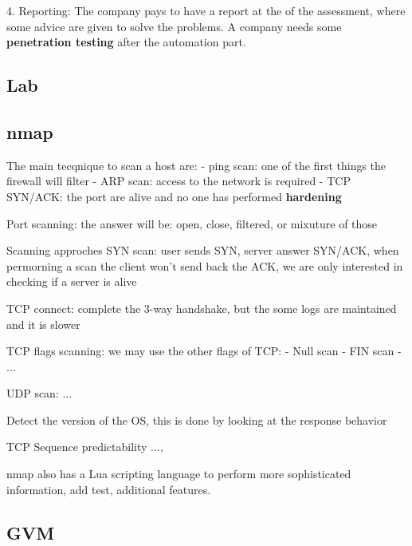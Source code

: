 \documentclass[12pt]{article}
\begin{document}
4. 
Reporting:
The company pays to have a report at the of the assessment, where some advice are given to solve the problems. A company needs some \textbf{penetration testing} after the automation part.


\subsection{Lab}
\subsection{nmap}
The main tecqnique to scan a host are:
- ping scan: one of the first things the firewall will filter
- ARP scan: access to the network is required
- TCP SYN/ACK: the port are alive and no one has performed \textbf{hardening}

Port scanning:
the answer will be: open, close, filtered, or mixuture of those

Scanning approches
SYN scan: user sends SYN, server answer SYN/ACK, when permorning a scan the client won't send back the ACK, we are only interested in checking if a server is alive

TCP connect: complete the 3-way handshake, but the some logs are maintained and it is slower

TCP flags scanning: we may use the other flags of TCP:
- Null scan
- FIN scan 
- ...

UDP scan:
 ...


Detect the version of the OS, this is done by looking at the response behavior

TCP Sequence predictability ...,

nmap also has a Lua scripting language to perform more sophisticated information, add test, additional features.

\subsection{GVM}
\end{document}

